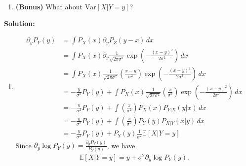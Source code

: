 \documentclass[12pt]{article}
\newcommand{\fE}{\mathbb{E}}
\renewcommand{\Var}[1]{\mathrm{Var}\left[#1\right]}
\begin{document}
\begin{enumerate}
\begin{enumerate}
\item {\bf (Bonus)} What about $\Var{X|Y=y}$? 
\end{enumerate}

\begin{solution}
\textbf{Solution:}\\
\begin{enumerate}
    \item
    \begin{align*}
        \partial_y P_Y(y) 
        &= \int P_X(x) \partial_y P_Z(y - x)\, dx \\
        &= \int P_X(x) \partial_y \frac{1}{\sqrt{2\pi\sigma^2}} \exp\left(-\frac{(x - y)^2}{2\sigma^2}\right)\, dx \\
        &= \int P_X(x) \frac{1}{\sqrt{2\pi\sigma^2}} \left(\frac{x - y}{\sigma^2}\right)\exp\left(-\frac{(x - y)^2}{2\sigma^2}\right)\, dx \\
        &= -\frac{y}{\sigma^2} P_Y(y) + \int P_X(x) \frac{1}{\sqrt{2\pi\sigma^2}} \left(\frac{x}{\sigma^2}\right)\exp\left(-\frac{(x - y)^2}{2\sigma^2}\right)\, dx \\
        &= -\frac{y}{\sigma^2} P_Y(y) + \int \left(\frac{x}{\sigma^2}\right) P_X(x) P_{Y|X}(y | x)\, dx \\
        &= -\frac{y}{\sigma^2} P_Y(y) + \int \left(\frac{x}{\sigma^2}\right) P_Y(y) P_{X|Y}(x | y)\, dx \\
        &= -\frac{y}{\sigma^2} P_Y(y) + P_Y(y) \frac{1}{\sigma^2} \fE[X | Y = y]
    \end{align*}
    Since $\partial_y \log P_Y(y) = \frac{\partial_y P_Y(y)}{P_Y(y)}$, we have
    \begin{align*}
        \fE[X | Y = y] = y + \sigma^2 \partial_y \log P_Y(y).
    \end{align*}


\end{enumerate}
\end{solution}
\end{enumerate}
\end{document}
